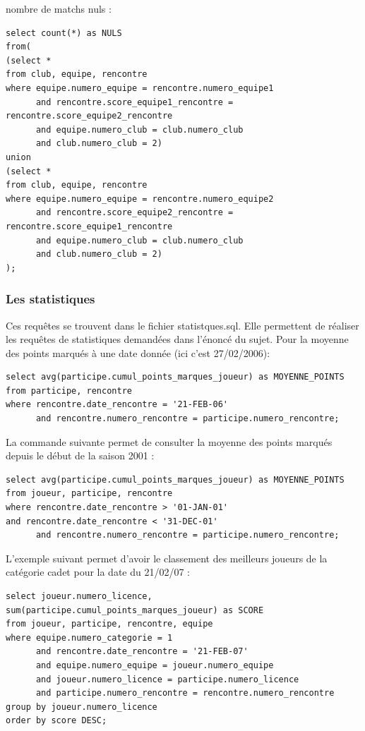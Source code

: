 \documentclass{article}
\begin{document}
nombre de matchs nuls : \\

\begin{verbatim}
select count(*) as NULS
from(
(select *
from club, equipe, rencontre
where equipe.numero_equipe = rencontre.numero_equipe1 
      and rencontre.score_equipe1_rencontre = rencontre.score_equipe2_rencontre
      and equipe.numero_club = club.numero_club
      and club.numero_club = 2)
union
(select *
from club, equipe, rencontre 
where equipe.numero_equipe = rencontre.numero_equipe2
      and rencontre.score_equipe2_rencontre = rencontre.score_equipe1_rencontre
      and equipe.numero_club = club.numero_club
      and club.numero_club = 2)
);
\end{verbatim}

\subsubsection{Les statistiques}
Ces requêtes se trouvent dans le fichier statistques.sql. Elle permettent de réaliser les requêtes de statistiques demandées dans l'énoncé du sujet.
Pour la moyenne des points marqués à une date donnée (ici c'est 27/02/2006): \\

\begin{verbatim}
select avg(participe.cumul_points_marques_joueur) as MOYENNE_POINTS
from participe, rencontre
where rencontre.date_rencontre = '21-FEB-06'
      and rencontre.numero_rencontre = participe.numero_rencontre;
\end{verbatim}

La commande suivante permet de consulter la moyenne des points marqués depuis le début de la saison 2001 : \\

\begin{verbatim}
select avg(participe.cumul_points_marques_joueur) as MOYENNE_POINTS
from joueur, participe, rencontre
where rencontre.date_rencontre > '01-JAN-01'
and rencontre.date_rencontre < '31-DEC-01'
      and rencontre.numero_rencontre = participe.numero_rencontre;
\end{verbatim}

L'exemple suivant permet d'avoir le classement des meilleurs joueurs de la catégorie cadet pour la date du 21/02/07 : \\

\begin{verbatim}
select joueur.numero_licence, sum(participe.cumul_points_marques_joueur) as SCORE
from joueur, participe, rencontre, equipe
where equipe.numero_categorie = 1
      and rencontre.date_rencontre = '21-FEB-07'
      and equipe.numero_equipe = joueur.numero_equipe
      and joueur.numero_licence = participe.numero_licence
      and participe.numero_rencontre = rencontre.numero_rencontre
group by joueur.numero_licence 
order by score DESC;
\end{verbatim}
\end{document}

